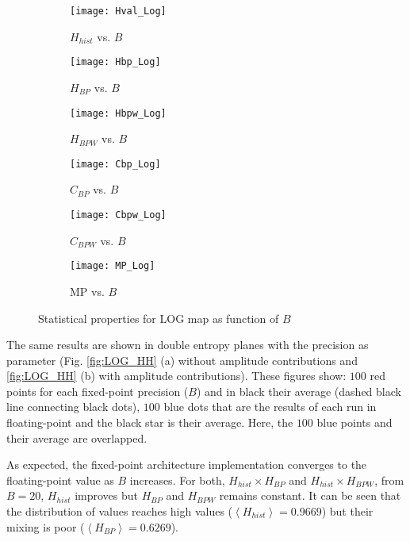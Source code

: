 \begin{figure}
	\centering
	\begin{subfigure}[b]{0.49\textwidth}
		\texttt{[image: Hval\_Log]}
		\caption{$H_{hist}$ vs. $B$}
		\label{fig:Hval_Log}
	\end{subfigure}
	\begin{subfigure}[b]{0.49\textwidth}
		\texttt{[image: Hbp\_Log]}
		\caption{$H_{BP}$ vs. $B$}
		\label{fig:Hbp_Log}
	\end{subfigure}
	\begin{subfigure}[b]{0.49\textwidth}
		\texttt{[image: Hbpw\_Log]}
		\caption{$H_{BPW}$ vs. $B$}
		\label{fig:Hbpw_Log}
	\end{subfigure}
	\begin{subfigure}[b]{0.49\textwidth}
		\texttt{[image: Cbp\_Log]}
		\caption{$C_{BP}$ vs. $B$}
		\label{fig:Cbp_Log}
	\end{subfigure}
	\begin{subfigure}[b]{0.49\textwidth}
		\texttt{[image: Cbpw\_Log]}
		\caption{$C_{BPW}$ vs. $B$}
		\label{fig:Cbpw_Log}
	\end{subfigure}
	\begin{subfigure}[b]{0.49\textwidth}
		\texttt{[image: MP\_Log]}
		\caption{MP vs. $B$}
		\label{fig:MP_Log}
	\end{subfigure}
	\caption{Statistical properties for LOG map as function of $B$}
	\label{fig:LOG_QuantiB}
\end{figure}

The same results are shown in double entropy planes with the precision as parameter (Fig. \ref{fig:LOG_HH} (a) without amplitude contributions and \ref{fig:LOG_HH} (b) with amplitude contributions).
These figures show: $100$ red points for each fixed-point precision ($B$) and in black their average (dashed black line connecting black dots), $100$ blue dots that are the results of each run in floating-point and the black star is their average.
Here, the $100$ blue points and their average are overlapped.

As expected, the fixed-point architecture implementation converges to the floating-point value as $B$ increases.
For both, $H_{hist} \times H_{BP}$ and $H_{hist} \times H_{BPW}$, from $B=20$, $H_{hist}$ improves but $H_{BP}$ and $H_{BPW}$ remains constant.
It can be seen that the distribution of values reaches high values ($\left\langle H_{hist}\right\rangle =0.9669$) but their mixing is poor ($\left\langle H_{BP}\right\rangle =0.6269$).

